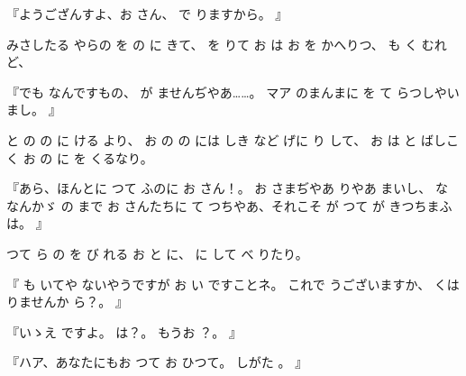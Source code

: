 
『ようござんすよ、お
さん、
で
りますから。
』

みさしたる
やらの
を
の
に
きて、
を
りて
お
は
お
を
かへりつ、
も
く
むれど、

『でも
なんですもの、
が
ませんぢやあ……。
マア
のまんまに
を
て
らつしやいまし。
』

と
の
の
に
ける
より、
お
の
の
には
しき
など
げに
り
して、
お
は
と
ばしこく
お
の
に
を
くるなり。

『あら、ほんとに
つて
ふのに
お
さん！。
お
さまぢやあ
りやあ
まいし、
な
なんかゞ
の
まで
お
さんたちに
て
つちやあ、それこそ
が
つて
が
きつちまふは。
』

つて
ら
の
を
び
れる
お
と
に、
に
して
べ
りたり。

『
も
いてや
ないやうですが
お
い
ですことネ。
これで
うございますか、
くは
りませんか
ら？。
』

『いゝえ
ですよ。
は？。
もうお
？。
』

『ハア、あなたにもお
つて
お
ひつて。
しがた
。
』

